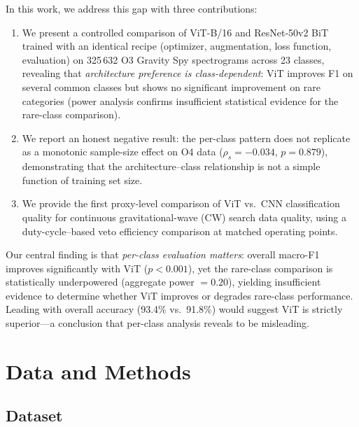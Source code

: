 \documentclass[12pt]{article}
\newcommand{\Ntotal}{325\,632}
\newcommand{\Nclasses}{23}
\newcommand{\vitAccuracy}{93.4\%}
\newcommand{\cnnAccuracy}{91.8\%}
\newcommand{\spearmanRhoOfour}{-0.034}
\newcommand{\spearmanPOfour}{0.879}
\begin{document}
In this work, we address this gap with three contributions:
\begin{enumerate}
  \item We present a controlled comparison of ViT-B/16 and ResNet-50v2 BiT
    trained with an identical recipe (optimizer, augmentation, loss function,
    evaluation) on \Ntotal{} O3 Gravity Spy spectrograms across \Nclasses{}
    classes, revealing that \emph{architecture preference is
    class-dependent}: ViT improves F1 on several common classes but shows
    no significant improvement on rare categories (power analysis confirms
    insufficient statistical evidence for the rare-class comparison).
  \item We report an honest negative result: the per-class pattern does not
    replicate as a monotonic sample-size effect on O4 data
    ($\rho_s = \spearmanRhoOfour$, $p = \spearmanPOfour$), demonstrating that
    the architecture--class relationship is not a simple function of training
    set size.
  \item We provide %
    the first proxy-level comparison of ViT vs.\ CNN
    classification quality for continuous gravitational-wave (CW) search data
    quality, using a duty-cycle--based veto efficiency comparison at matched
    operating points.
\end{enumerate}

Our central finding is that \emph{per-class evaluation matters}: overall
macro-F1 improves significantly with ViT ($p < 0.001$), yet the rare-class
comparison is statistically underpowered (aggregate power $= 0.20$), yielding
insufficient evidence to determine whether ViT improves or degrades
rare-class performance.
Leading with overall accuracy (\vitAccuracy{} vs.\ \cnnAccuracy) would suggest
ViT is strictly superior---a conclusion that per-class analysis reveals to be
misleading.


\section{Data and Methods}
\label{sec:methods}

\subsection{Dataset}
\label{sec:dataset}
\end{document}
